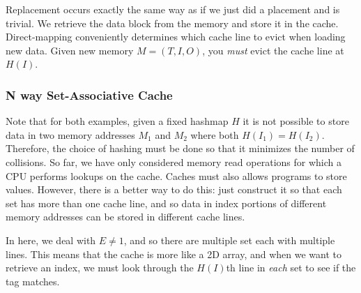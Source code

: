 \documentclass{article}
\begin{document}
      \begin{theorem}[Replacement]
        Replacement occurs exactly the same way as if we just did a placement and is trivial. We retrieve the data block from the memory and store it in the cache. Direct-mapping conveniently determines which cache line to evict when loading new data. Given new memory $M = (T, I, O)$, you \textit{must} evict the cache line at $H(I)$. 
      \end{theorem}

    \subsubsection{N way Set-Associative Cache}

      Note that for both examples, given a fixed hashmap $H$ it is not possible to store data in two memory addresses $M_1$ and $M_2$ where both $H(I_1) = H(I_2)$. Therefore, the choice of hashing must be done so that it minimizes the number of collisions. So far, we have only considered memory read operations for which a CPU performs lookups on the cache. Caches must also allows programs to store values. However, there is a better way to do this: just construct it so that each set has more than one cache line, and so data in index portions of different memory addresses can be stored in different cache lines.

      In here, we deal with $E \neq 1$, and so there are multiple set each with multiple lines. This means that the cache is more like a 2D array, and when we want to retrieve an index, we must look through the $H(I)$th line in \textit{each} set to see if the tag matches. 
\end{document}
